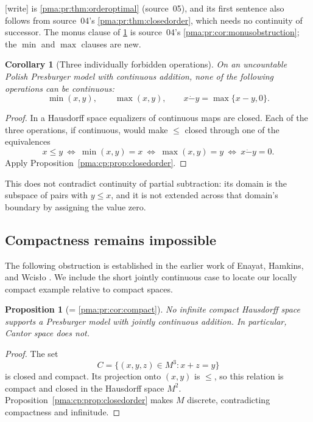 \documentclass[11pt]{article}
\numberwithin{equation}{section}
\newtheorem{proposition}[proposition]{Proposition}
\newtheorem{corollary}[corollary]{Corollary}
\theoremstyle{definition}
\theoremstyle{remark}
\newcommand{\monus}{\mathbin{\dot{-}}}
\newcommand{\writetag}{\textup{\textsf{\small[write]}}}
\begin{document}
\noindent\writetag{}  is \cref{pma:pr:thm:orderoptimal}
(source~05), and its first sentence also follows from source~04's
\cref{pma:pr:thm:closedorder}, which needs no continuity of successor. The
monus clause of \cref{pma:cp:cor:orderoperations} is source~04's
\cref{pma:pr:cor:monusobstruction}; the $\min$ and $\max$ clauses are new.

\begin{corollary}[Three individually forbidden operations]
\label{pma:cp:cor:orderoperations}
On an uncountable Polish Presburger model with continuous addition, none
of the following operations can be continuous:
\[
\min(x,y),\qquad \max(x,y),\qquad
x\mathbin{\monus}y=\max\{x-y,0\}.
\]
\end{corollary}

\begin{proof}
In a Hausdorff space equalizers of continuous maps are closed. Each of
the three operations, if continuous, would make $\leq$ closed through
one of the equivalences
\[
x\leq y\ \Longleftrightarrow\ \min(x,y)=x
\ \Longleftrightarrow\ \max(x,y)=y
\ \Longleftrightarrow\ x\mathbin{\monus}y=0.
\]
Apply Proposition~\ref{pma:cp:prop:closedorder}.
\end{proof}

This does not contradict continuity of partial subtraction: its domain is
the subspace of pairs with $y\leq x$, and it is not extended across that
domain's boundary by assigning the value zero.

\subsection{Compactness remains impossible}

The following obstruction is established in the earlier work of Enayat,
Hamkins, and Wcis\l{}o \cite{EHW}. We include the short jointly continuous
case to locate our locally compact example relative to compact spaces.

\begin{proposition}[= \cref{pma:pr:cor:compact}]
\label{pma:cp:prop:compact}
No infinite compact Hausdorff space supports a Presburger model with
jointly continuous addition. In particular, Cantor space does not.
\end{proposition}

\begin{proof}
The set
\[
C=\{(x,y,z)\in M^3:x+z=y\}
\]
is closed and compact. Its projection onto $(x,y)$ is $\leq$, so this
relation is compact and closed in the Hausdorff space $M^2$.
Proposition~\ref{pma:cp:prop:closedorder} makes $M$ discrete, contradicting
compactness and infinitude.
\end{proof}
\end{document}
